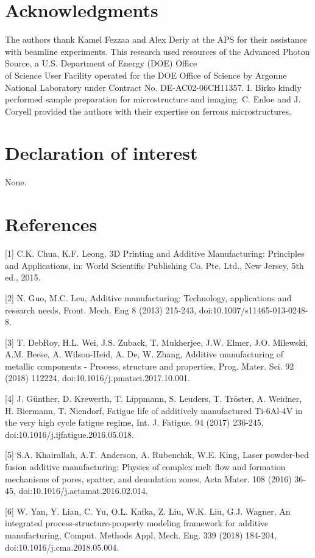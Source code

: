 \documentclass[10pt]{article}
\begin{document}
\section*{Acknowledgments}
The authors thank Kamel Fezzaa and Alex Deriy at the APS for their assistance with beamline experiments. This research used resources of the Advanced Photon Source, a U.S. Department of Energy (DOE) Office\\
of Science User Facility operated for the DOE Office of Science by Argonne National Laboratory under Contract No. DE-AC02-06CH11357. I. Birko kindly performed sample preparation for microstructure and imaging. C. Enloe and J. Coryell provided the authors with their expertise on ferrous microstructures.

\section*{Declaration of interest}
None.

\section*{References}
[1] C.K. Chua, K.F. Leong, 3D Printing and Additive Manufacturing: Principles and Applications, in: World Scientific Publishing Co. Pte. Ltd., New Jersey, 5th ed., 2015.

[2] N. Guo, M.C. Leu, Additive manufacturing: Technology, applications and research needs, Front. Mech. Eng 8 (2013) 215-243, doi:10.1007/s11465-013-0248-8.

[3] T. DebRoy, H.L. Wei, J.S. Zuback, T. Mukherjee, J.W. Elmer, J.O. Milewski, A.M. Beese, A. Wilson-Heid, A. De, W. Zhang, Additive manufacturing of metallic components - Process, structure and properties, Prog. Mater. Sci. 92 (2018) 112224, doi:10.1016/j.pmatsci.2017.10.001.

[4] J. Günther, D. Krewerth, T. Lippmann, S. Leuders, T. Tröster, A. Weidner, H. Biermann, T. Niendorf, Fatigue life of additively manufactured Ti-6Al-4V in the very high cycle fatigue regime, Int. J. Fatigue. 94 (2017) 236-245, doi:10.1016/j.ijfatigue.2016.05.018.

[5] S.A. Khairallah, A.T. Anderson, A. Rubenchik, W.E. King, Laser powder-bed fusion additive manufacturing: Physics of complex melt flow and formation mechanisms of pores, spatter, and denudation zones, Acta Mater. 108 (2016) 36-45, doi:10.1016/j.actamat.2016.02.014.

[6] W. Yan, Y. Lian, C. Yu, O.L. Kafka, Z. Liu, W.K. Liu, G.J. Wagner, An integrated process-structure-property modeling framework for additive manufacturing, Comput. Methods Appl. Mech. Eng. 339 (2018) 184-204, doi:10.1016/j.cma.2018.05.004.
\end{document}
